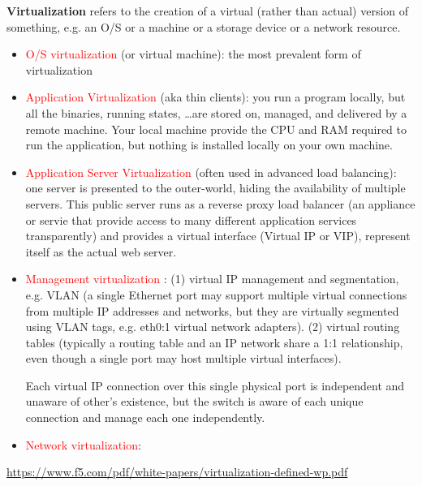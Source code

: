{\bf Virtualization} refers to the creation of a virtual (rather than actual)
version of something, e.g. an O/S or a machine or a storage device or a network
resource.
\begin{itemize}
  \item \textcolor{red}{O/S virtualization} (or virtual machine): the most
  prevalent form of virtualization

  \item \textcolor{red}{Application Virtualization} (aka thin clients): you run
  a program locally, but all the binaries, running states, \ldots are stored on,
  managed, and delivered by a remote machine. Your local machine provide the CPU
  and RAM required to run the application, but nothing is installed locally on
  your own machine.
  
  
  \item \textcolor{red}{Application Server Virtualization} (often used in
  advanced load balancing): one server is presented to the outer-world, hiding the
  availability of multiple servers. This public server runs as a reverse 
  proxy load balancer (an appliance or servie that provide access to many
  different application services transparently) and provides a virtual interface
  (Virtual IP or VIP), represent itself as the actual web server.
  
   \item \textcolor{red}{Management virtualization} : (1) virtual IP management
   and segmentation, e.g. VLAN (a single Ethernet port may support multiple
   virtual connections from multiple IP addresses and networks, but they are
   virtually segmented using VLAN tags, e.g. eth0:1 virtual network adapters).
   (2) virtual routing tables (typically a routing table and an IP network share
   a 1:1 relationship, even though a single port may host multiple virtual
   interfaces).
   
   Each virtual IP connection over this single physical port is independent and
   unaware of other's existence, but the switch is aware of each unique
   connection and manage each one independently.
   
   
   
   
   \item \textcolor{red}{Network virtualization}: 
   
\end{itemize}
\url{https://www.f5.com/pdf/white-papers/virtualization-defined-wp.pdf}

